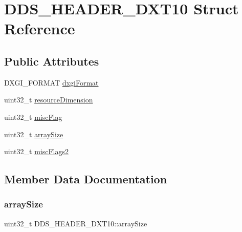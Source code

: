 \hypertarget{struct_d_d_s___h_e_a_d_e_r___d_x_t10}{}\section{D\+D\+S\+\_\+\+H\+E\+A\+D\+E\+R\+\_\+\+D\+X\+T10 Struct Reference}
\label{struct_d_d_s___h_e_a_d_e_r___d_x_t10}
\subsection*{Public Attributes}
\begin{DoxyCompactItemize}
\item 
D\+X\+G\+I\+\_\+\+F\+O\+R\+M\+AT \hyperlink{struct_d_d_s___h_e_a_d_e_r___d_x_t10_a7208befc03e44222386ee54ee4fa9ec6}{dxgi\+Format}
\item 
uint32\+\_\+t \hyperlink{struct_d_d_s___h_e_a_d_e_r___d_x_t10_a9e52c1afbd5b8205619d1b89a367b438}{resource\+Dimension}
\item 
uint32\+\_\+t \hyperlink{struct_d_d_s___h_e_a_d_e_r___d_x_t10_ab1ed2a42216afc03971b56f7833c8c05}{misc\+Flag}
\item 
uint32\+\_\+t \hyperlink{struct_d_d_s___h_e_a_d_e_r___d_x_t10_ac4da0d495a89e556d02ac256af28da41}{array\+Size}
\item 
uint32\+\_\+t \hyperlink{struct_d_d_s___h_e_a_d_e_r___d_x_t10_acfdbfd584a5c6de801da3c8d2f0e1a40}{misc\+Flags2}
\end{DoxyCompactItemize}


\subsection{Member Data Documentation}
\hypertarget{struct_d_d_s___h_e_a_d_e_r___d_x_t10_ac4da0d495a89e556d02ac256af28da41}{}\label{struct_d_d_s___h_e_a_d_e_r___d_x_t10_ac4da0d495a89e556d02ac256af28da41} 
\subsubsection{\texorpdfstring{array\+Size}{arraySize}}
{\footnotesize\ttfamily uint32\+\_\+t D\+D\+S\+\_\+\+H\+E\+A\+D\+E\+R\+\_\+\+D\+X\+T10\+::array\+Size}

